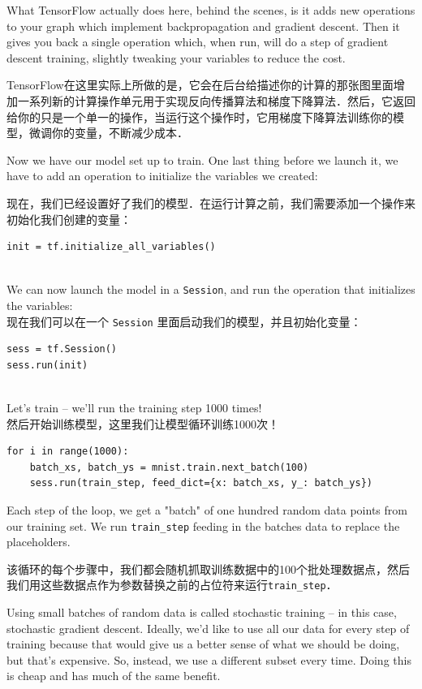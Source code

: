 What TensorFlow actually does here, behind the scenes, is it adds new operations to your graph which implement backpropagation and gradient descent. Then it gives you back a single operation which, when run, will do a step of gradient descent training, slightly tweaking your variables to reduce the cost.

TensorFlow在这里实际上所做的是，它会在后台给描述你的计算的那张图里面增加一系列新的计算操作单元用于实现反向传播算法和梯度下降算法．然后，它返回给你的只是一个单一的操作，当运行这个操作时，它用梯度下降算法训练你的模型，微调你的变量，不断减少成本．

Now we have our model set up to train. One last thing before we launch it, we have to add an operation to initialize the variables we created:

现在，我们已经设置好了我们的模型．在运行计算之前，我们需要添加一个操作来初始化我们创建的变量：

\begin{lstlisting}
init = tf.initialize_all_variables()
\end{lstlisting}
\\
We can now launch the model in a \lstinline{Session}, and run the operation that initializes the variables:\\
现在我们可以在一个 \lstinline{Session} 里面启动我们的模型，并且初始化变量：
\begin{lstlisting}
sess = tf.Session()
sess.run(init)
\end{lstlisting}
\\
Let's train -- we'll run the training step 1000 times!\\
然后开始训练模型，这里我们让模型循环训练1000次！
\begin{lstlisting}
for i in range(1000):
    batch_xs, batch_ys = mnist.train.next_batch(100)
    sess.run(train_step, feed_dict={x: batch_xs, y_: batch_ys})
\end{lstlisting}

Each step of the loop, we get a "batch" of one hundred random data points from our training set. We run \lstinline{train_step} feeding in the batches data to replace the placeholders.

该循环的每个步骤中，我们都会随机抓取训练数据中的100个批处理数据点，然后我们用这些数据点作为参数替换之前的占位符来运行\lstinline{train_step}．

Using small batches of random data is called stochastic training -- in this case, stochastic gradient descent. Ideally, we'd like to use all our data for every step of training because that would give us a better sense of what we should be doing, but that's expensive. So, instead, we use a different subset every time. Doing this is cheap and has much of the same benefit.

